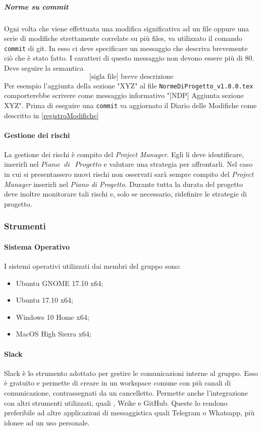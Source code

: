 \subparagraph{Norme su commit}\Spazio
Ogni volta che viene effettuata una modifica significativa ad un file oppure una serie di modifiche strettamente correlate su più files, va utilizzato il comando \texttt{commit} di git. In esso ci deve specificare un messaggio che descriva brevemente ciò che è stato fatto. I caratteri di questo messaggio non devono essere più di 80. Deve seguire la semantica
$$\text{[sigla file] breve descrizione}$$
Per esempio l'aggiunta della sezione "XYZ" al file \texttt{NormeDiProgetto\_v1.0.0.tex} comporterebbe scrivere come messaggio informativo "[NDP] Aggiunta sezione XYZ". Prima di eseguire una \texttt{commit} va aggiornato il Diario delle Modifiche come descritto in \ref{registroModifiche}

\paragraph{Gestione dei rischi} \Spazio
La gestione dei rischi è compito del \emph{Project Manager}. Egli li deve identificare, inserirli nel $Piano\text{ }di\text{ }Progetto$ e valutare una strategia per affrontarli. Nel caso in cui si presentassero nuovi rischi non osservati sarà sempre compito del \emph{Project Manager} inserirli nel \emph{Piano di Progetto}. Durante tutta la durata del progetto deve inoltre monitorare tali rischi e, solo se necessario, ridefinire le strategie di progetto.

\subsubsection{Strumenti}
\paragraph{Sistema Operativo} \Spazio
I sistemi operativi utilizzati dai membri del gruppo sono:
\begin{itemize}
	\item Ubuntu GNOME 17.10 x64;
	\item Ubuntu 17.10 x64;
	\item Windows 10 Home x64;
	\item MacOS High Sierra x64;
\end{itemize}

\paragraph{Slack}\Spazio
Slack è lo strumento adottato per gestire le comunicazioni interne al gruppo. Esso è gratuito e permette di creare in un workspace comune con più canali di comunicazione, contrassegnati da un cancelletto. Permette anche l'integrazione con altri strumenti utilizzati, quali , Wrike e GitHub. Queste  lo rendono preferibile ad altre applicazioni di messaggistica quali Telegram o Whatsapp, più idonee ad un uso personale.

